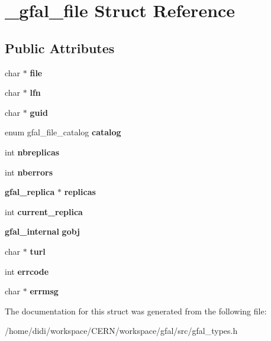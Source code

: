 \section{\_\-gfal\_\-file Struct Reference}
\label{struct__gfal__file}
\subsection*{Public Attributes}
\begin{DoxyCompactItemize}
\item 
char $\ast$ {\bfseries file}\label{struct__gfal__file_a83f47027ed48b63ac365aeae548bb14c}

\item 
char $\ast$ {\bfseries lfn}\label{struct__gfal__file_a03904ceae03e8e222084b98a81024ae6}

\item 
char $\ast$ {\bfseries guid}\label{struct__gfal__file_a42b2f1b21fd19676bd6e61a5d1b161e5}

\item 
enum gfal\_\-file\_\-catalog {\bfseries catalog}\label{struct__gfal__file_aa1216c9dc8fd1fb0075a510dae71793d}

\item 
int {\bfseries nbreplicas}\label{struct__gfal__file_ad9d4cb380539be8e758340f552279f1c}

\item 
int {\bfseries nberrors}\label{struct__gfal__file_aba36b25fbef86c632c22569a3db29981}

\item 
{\bf gfal\_\-replica} $\ast$ {\bfseries replicas}\label{struct__gfal__file_ae405e79459da36dddd32549420532bf3}

\item 
int {\bfseries current\_\-replica}\label{struct__gfal__file_a0fb1524f340fb9aa496df763b7554381}

\item 
{\bf gfal\_\-internal} {\bfseries gobj}\label{struct__gfal__file_a946c3901b3b533df54a5294f0e69dd74}

\item 
char $\ast$ {\bfseries turl}\label{struct__gfal__file_aeccab6b81f1610aae629d6390b5202ed}

\item 
int {\bfseries errcode}\label{struct__gfal__file_adab9bd2c187b6e2a38b8566f3786454e}

\item 
char $\ast$ {\bfseries errmsg}\label{struct__gfal__file_a7260d457e0441321edde2ce2d25e59aa}

\end{DoxyCompactItemize}


The documentation for this struct was generated from the following file:\begin{DoxyCompactItemize}
\item 
/home/didi/workspace/CERN/workspace/gfal/src/gfal\_\-types.h\end{DoxyCompactItemize}
